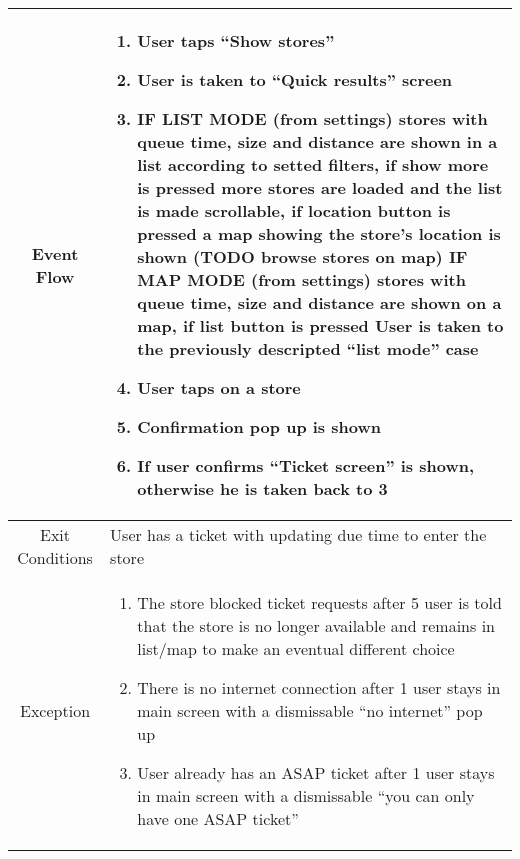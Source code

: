 \begin{enumerate}
\begin{table}[H]
{\begin{tabular}{|c|p{14cm}|}
		Event Flow & \begin{enumerate}
			\item User taps “Show stores”
			\item User is taken to “Quick results” screen
			\item IF LIST MODE (from settings)\newline
			stores with queue time, size and distance are shown in a list according to setted filters, if show more is pressed more stores are loaded and the list is made scrollable, if location button is pressed a map showing the store’s location is shown (TODO browse stores on map)\newline
			IF MAP MODE (from settings\newline)
			stores with queue time, size and distance are shown on a map, if list button is pressed User is taken to the previously descripted “list mode” case
			\item User taps on a store
			\item Confirmation pop up is shown
			\item If user confirms “Ticket screen” is shown, otherwise he is taken back to 3
		\end{enumerate}\\
	
		\hline
		Exit Conditions & User has a ticket with updating due time to enter the store\\
		\hline
		
		Exception & \begin{enumerate}
			\item The store blocked ticket requests\newline
			after 5 user is told that the store is no longer available and remains in list/map to make an eventual different choice
			
			\item There is no internet connection\newline
			after 1 user stays in main screen with a dismissable “no internet” pop up
			
			\item User already has an ASAP ticket\newline
			after 1 user stays in main screen with a dismissable “you can only have one ASAP ticket” 
			
		\end{enumerate}\\
		
		\hline
	\end{tabular}
}
\end{table}


\end{enumerate}
